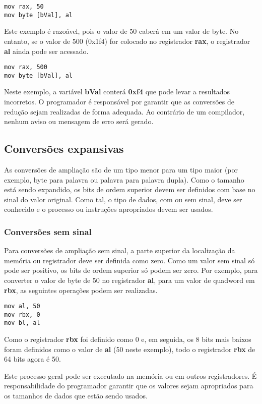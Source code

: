 \begin{lstlisting}
mov rax, 50
mov byte [bVal], al
\end{lstlisting}

Este exemplo é razoável, pois o valor de 50 caberá em um valor de byte. No entanto, se o valor de 500 (0x1f4) for colocado no registrador \textbf{rax}, o registrador \textbf{al} ainda pode ser acessado.
\begin{lstlisting}
mov rax, 500
mov byte [bVal], al
\end{lstlisting}

Neste exemplo, a variável \textbf{bVal} conterá \textbf{0xf4} que pode levar a resultados incorretos. O programador é responsável por garantir que as conversões de redução sejam realizadas de forma adequada. Ao contrário de um compilador, nenhum aviso ou mensagem de erro será gerado.

\subsection{Conversões expansivas}
As conversões de ampliação são de um tipo menor para um tipo maior (por exemplo, byte para palavra ou palavra para palavra dupla). Como o tamanho está sendo expandido, os bits de ordem superior devem ser definidos com base no sinal do valor original. Como tal, o tipo de dados, com ou sem sinal, deve ser conhecido e o processo ou instruções apropriados devem ser usados.

\subsubsection{Conversões sem sinal}
Para conversões de ampliação sem sinal, a parte superior da localização da memória ou registrador deve ser definida como zero. Como um valor sem sinal só pode ser positivo, os bits de ordem superior só podem ser zero. Por exemplo, para converter o valor de byte de 50 no registrador \textbf{al}, para um valor de quadword em \textbf{rbx}, as seguintes operações podem ser realizadas.
\begin{lstlisting}
mov al, 50
mov rbx, 0
mov bl, al
\end{lstlisting}

Como o registrador \textbf{rbx} foi definido como 0 e, em seguida, os 8 bits mais baixos foram definidos como o valor de \textbf{al} (50 neste exemplo), todo o registrador \textbf{rbx} de 64 bits agora é 50.

Este processo geral pode ser executado na memória ou em outros registradores. É responsabilidade do programador garantir que os valores sejam apropriados para os tamanhos de dados que estão sendo usados.

